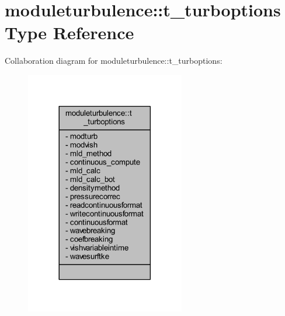 \hypertarget{structmoduleturbulence_1_1t__turboptions}{}\section{moduleturbulence\+:\+:t\+\_\+turboptions Type Reference}
\label{structmoduleturbulence_1_1t__turboptions}


Collaboration diagram for moduleturbulence\+:\+:t\+\_\+turboptions\+:\nopagebreak
\begin{figure}[H]
\begin{center}
\leavevmode
\includegraphics[width=197pt]{structmoduleturbulence_1_1t__turboptions__coll__graph}
\end{center}
\end{figure}
